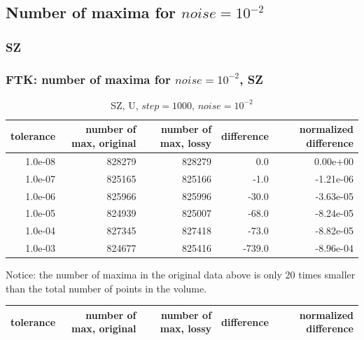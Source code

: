 \subsection{Number of maxima for $noise = 10^{-2}$}
\subsubsection{SZ}
\begin{frame}[fragile]
  \frametitle{FTK: number of maxima for $noise = 10^{-2}$, SZ }

{\tiny
\begin{table}[H]
\centering
\begin{tabular}{|r|r|r|r|r|}
\hline
tolerance &         number of max, original &         number of max, lossy &       difference & normalized difference \\
\hline
  1.0e-08 &           828279 &        828279 &             0.0 &       0.00e+00 \\
\hline
  1.0e-07 &           825165 &        825166 &            -1.0 &      -1.21e-06 \\
\hline
  1.0e-06 &           825966 &        825996 &           -30.0 &      -3.63e-05 \\
\hline
  1.0e-05 &           824939 &        825007 &           -68.0 &      -8.24e-05 \\
\hline
  1.0e-04 &           827345 &        827418 &           -73.0 &      -8.82e-05 \\
\hline
  1.0e-03 &           824677 &        825416 &          -739.0 &      -8.96e-04 \\
\hline
\end{tabular}
\caption{SZ, U, $step = 1000$, $noise = 10^{-2}$}
\label{sz_u_table}
\end{table}
}

{\tiny
Notice: the number of maxima in the original data above is only 20 times smaller than the total number of points in the volume.
}

{\tiny
\begin{table}[H]
\centering
\begin{tabular}{|r|r|r|r|r|}
\hline
tolerance &         number of max, original &         number of max, lossy &       difference & normalized difference \\
\hline


\end{tabular}
\end{table}}
\end{frame}
